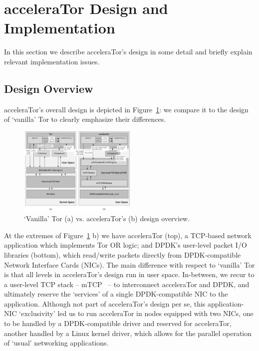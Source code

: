 \section{acceleraTor Design and Implementation}
\label{sec:design}

In this section we describe acceleraTor's design in some detail and briefly 
explain relevant implementation issues.

\subsection{Design Overview}
\label{subsec:design-overview}

acceleraTor's overall design is depicted in Figure~\ref{fig:accelerator-design}: we 
compare it to the design of `vanilla' Tor to clearly emphasize their differences.

\begin{figure}[h!]

    \centering
    \includegraphics[width=0.50\textwidth]{figures/design.png}
    \cprotect\caption{`Vanilla' Tor (a) vs. acceleraTor's (b) design overview.}
    \label{fig:accelerator-design}

\end{figure}

At the extremes of Figure~\ref{fig:accelerator-design} b) we have acceleraTor (top), a TCP-based network 
application which implements Tor OR logic; and DPDK's user-level packet I\slash O 
libraries (bottom), which read\slash write packets directly 
from DPDK-compatible Network Interface Cards (NICs). 
The main difference with respect to `vanilla' Tor is that all levels in 
acceleraTor's design run in user space. In-between, we recur to a user-level 
TCP stack -- mTCP~\cite{179773} -- to interconnect acceleraTor and DPDK, 
and ultimately reserve the `services' of 
a single DPDK-compatible NIC to the application. Although not 
part of acceleraTor's design per se, this 
application-NIC `exclusivity' led us to run acceleraTor in nodes equipped with 
two NICs, one to be handled by a DPDK-compatible driver and reserved for 
acceleraTor, another handled by a Linux kernel driver, which allows for the parallel operation of `usual' 
networking applications.

